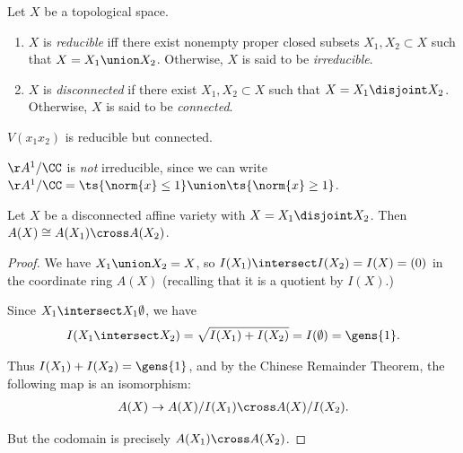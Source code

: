 \begin{definition}

Let \(X\) be a topological space.

\begin{enumerate}
\def\labelenumi{\alph{enumi}.}
\item
  \(X\) is \emph{reducible} iff there exist nonempty proper closed
  subsets \(X_1 ,X_2 \subset X\) such that \(X = X_1 \union X_2\).
  Otherwise, \(X\) is said to be \emph{irreducible}.
\item
  \(X\) is \emph{disconnected} if there exist \(X_1, X_2 \subset X\)
  such that \(X = X_1 \disjoint X_2\). Otherwise, \(X\) is said to be
  \emph{connected}.
\end{enumerate}

\end{definition}

\begin{example}

\(V(x_1 x_2)\) is reducible but connected.

\end{example}

\begin{remark}

\(\AA^1/\CC\) is \emph{not} irreducible, since we can write
\(\AA^1/\CC = \ts{\norm{x} \leq 1} \union \ts{\norm{x} \geq 1}\).

\end{remark}

\begin{proposition}[?]

Let \(X\) be a disconnected affine variety with
\(X = X_1 \disjoint X_2\). Then \(A(X) \cong A(X_1) \cross A(X_2)\).

\end{proposition}

\begin{proof}

We have \(X_1 \union X_2 = X\), so
\(I(X_1) \intersect I(X_2) = I(X) = (0)\) in the coordinate ring
\(A(X)\) (recalling that it is a quotient by \(I(X)\).)

Since \(X_1 \intersect X_1 \emptyset\), we have
\begin{align*}  
I(X_1 \intersect X_2) = \sqrt{I(X_1) + I(X_2) } = I(\emptyset) = \gens{1}
.\end{align*}

Thus \(I(X_1) + I(X_2) = \gens{1}\), and by the Chinese Remainder
Theorem, the following map is an isomorphism:
\begin{align*}  
A(X) \to A(X)/I(X_1) \cross A(X) / I(X_2)
.\end{align*}

But the codomain is precisely \(A(X_1) \cross A(X_2)\).

\end{proof}

